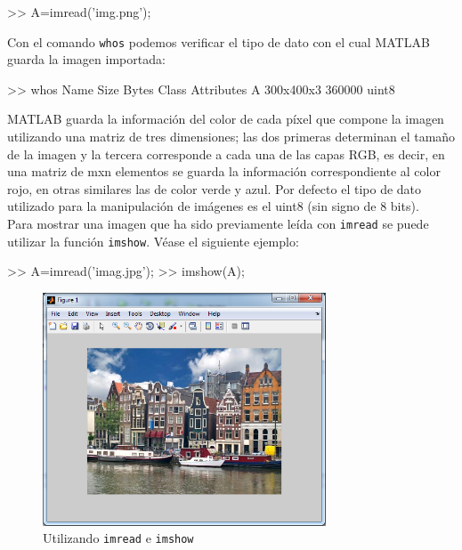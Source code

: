 \begin{matlab}
>> A=imread('img.png');
\end{matlab}

Con el comando \texttt{whos} podemos verificar el tipo de dato con el
cual MATLAB guarda la imagen importada:

\begin{matlab}
>> whos
  Name        Size                Bytes  Class    Attributes
  A         300x400x3            360000  uint8    
\end{matlab}

MATLAB guarda la información del color de cada píxel que compone la
imagen utilizando una matriz de tres dimensiones; las dos primeras
determinan el tamaño de la imagen y la tercera corresponde a cada una de
las capas RGB, es decir, en una matriz de mxn elementos se guarda la
información correspondiente al color rojo, en otras similares las de
color verde y azul. Por defecto el tipo de dato utilizado para la
manipulación de imágenes es el uint8 (sin signo de 8 bits). \\

Para mostrar una imagen que ha sido previamente leída con \texttt{imread} se
puede utilizar la función \texttt{imshow}. Véase el siguiente ejemplo:

\begin{matlab}
>> A=imread('imag.jpg');
>> imshow(A);
\end{matlab}

\begin{figure}[htbp]
    \centering
    \includegraphics[width=0.75\textwidth]{images/ch7/holland_imshow.png}
    \caption{Utilizando \texttt{imread} e \texttt{imshow}}
    \label{fig:holland_imshow}
\end{figure}


